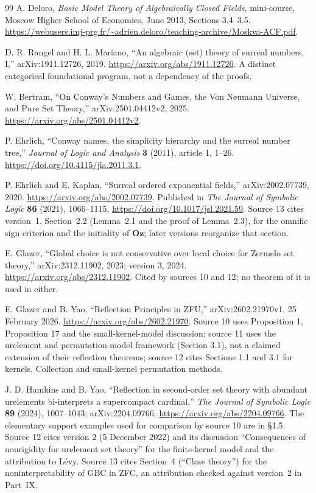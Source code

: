 \documentclass[11pt,letterpaper]{article}
\theoremstyle{definition}
\theoremstyle{remark}
\newcommand{\Oz}{\mathbf{Oz}}
\begin{document}
\begin{thebibliography}{99}
A. Deloro, \emph{Basic Model Theory of Algebraically Closed Fields}, mini-course,
Moscow Higher School of Economics, June 2013, Sections 3.4--3.5.
\url{https://webusers.imj-prg.fr/~adrien.deloro/teaching-archive/Moskva-ACF.pdf}.

D. R. Rangel and H. L. Mariano, ``An algebraic (set) theory of surreal numbers,
I,'' arXiv:1911.12726, 2019. \url{https://arxiv.org/abs/1911.12726}.
A distinct categorical foundational program, not a dependency of the proofs.

W. Bertram, ``On Conway's Numbers and Games, the Von Neumann Universe, and Pure
Set Theory,'' arXiv:2501.04412v2, 2025. \url{https://arxiv.org/abs/2501.04412v2}.

P. Ehrlich, ``Conway names, the simplicity hierarchy and the surreal number
tree,'' \emph{Journal of Logic and Analysis} \textbf{3} (2011), article 1,
1--26. \url{https://doi.org/10.4115/jla.2011.3.1}.

P. Ehrlich and E. Kaplan, ``Surreal ordered exponential fields,''
arXiv:2002.07739, 2020. \url{https://arxiv.org/abs/2002.07739}. Published in
\emph{The Journal of Symbolic Logic} \textbf{86} (2021), 1066--1115,
\url{https://doi.org/10.1017/jsl.2021.59}. Source 13 cites version~1, Section~2.2
(Lemma~2.1 and the proof of Lemma~2.3), for the omnific sign criterion and the
initiality of $\Oz$; later versions reorganize that section.


\raggedright
E. Glazer, ``Global choice is not conservative over local choice for Zermelo
set theory,'' arXiv:2312.11902, 2023; version 3, 2024.
\url{https://arxiv.org/abs/2312.11902}. Cited by sources 10 and 12; no
theorem of it is used in either.

E. Glazer and B. Yao, ``Reflection Principles in ZFU,'' arXiv:2602.21970v1,
25 February 2026. \url{https://arxiv.org/abs/2602.21970}. Source 10 uses
Proposition 1, Proposition 17 and the small-kernel-model discussion; source 11
uses the urelement and permutation-model framework (Section 3.1), not a claimed
extension of their reflection theorems; source 12 cites Sections 1.1 and 3.1
for kernels, Collection and small-kernel permutation methods.

J. D. Hamkins and B. Yao, ``Reflection in second-order set theory with abundant
urelements bi-interprets a supercompact cardinal,'' \emph{The Journal of
Symbolic Logic} \textbf{89} (2024), 1007--1043; arXiv:2204.09766.
\url{https://arxiv.org/abs/2204.09766}. The elementary support examples used
for comparison by source 10 are in \S1.5. Source 12 cites version 2 (5 December
2022) and its discussion ``Consequences of nonrigidity for urelement set
theory'' for the finite-kernel model and the attribution to L\'evy. Source 13
cites Section~4 (``Class theory'') for the noninterpretability of GBC in ZFC, an
attribution checked against version~2 in Part~IX.


\end{thebibliography}
\end{document}
